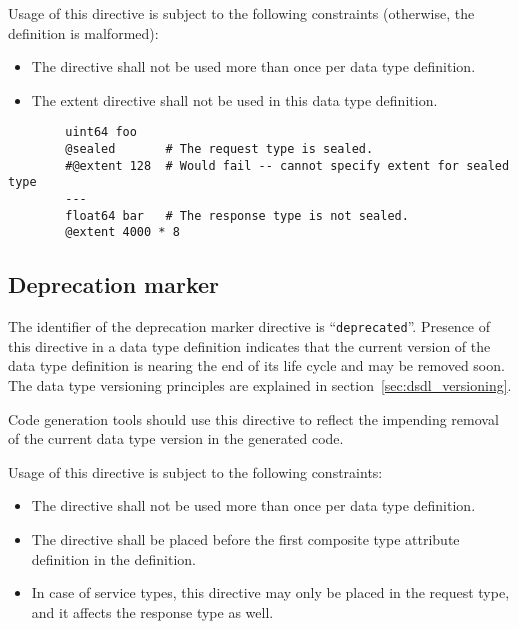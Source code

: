 Usage of this directive is subject to the following constraints (otherwise, the definition is malformed):
\begin{itemize}
    \item The directive shall not be used more than once per data type definition.
    \item The extent directive shall not be used in this data type definition.
\end{itemize}

\begin{remark}
    \begin{verbatim}
        uint64 foo
        @sealed       # The request type is sealed.
        #@extent 128  # Would fail -- cannot specify extent for sealed type
        ---
        float64 bar   # The response type is not sealed.
        @extent 4000 * 8
    \end{verbatim}
\end{remark}

\subsection{Deprecation marker}

The identifier of the deprecation marker directive is ``\verb|deprecated|''.
Presence of this directive in a data type definition indicates that the current version of the data type definition
is nearing the end of its life cycle and may be removed soon.
The data type versioning principles are explained in section~\ref{sec:dsdl_versioning}.

Code generation tools should use this directive to reflect the impending removal of the current data type version
in the generated code.

Usage of this directive is subject to the following constraints:
\begin{itemize}
    \item The directive shall not be used more than once per data type definition.
    \item The directive shall be placed before the first composite type attribute definition in the definition.
    \item In case of service types, this directive may only be placed in the request type,
    and it affects the response type as well.
\end{itemize}


